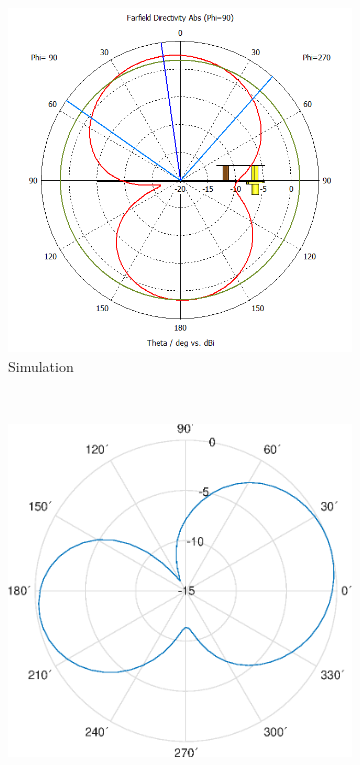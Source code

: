 \documentclass[11pt,a4paper]{article}
\begin{document}
        \begin{figure}[!ht]
            \centering
            \begin{subfigure}{.4\textwidth}
                \centering
                \includegraphics[width=\textwidth]{src/pifa-sim-radiation-e-0G9Hz.png}
                \caption{\label{fig:pifa-sim-radiation-e-0G9Hz}Simulation}
            \end{subfigure}
            ~
            \begin{subfigure}{.4\textwidth}
                \centering
                \includegraphics[width=\textwidth]{src/pifa-meas-radiation-e-0G9Hz.eps}

\end{subfigure}
\end{figure}
\end{document}
